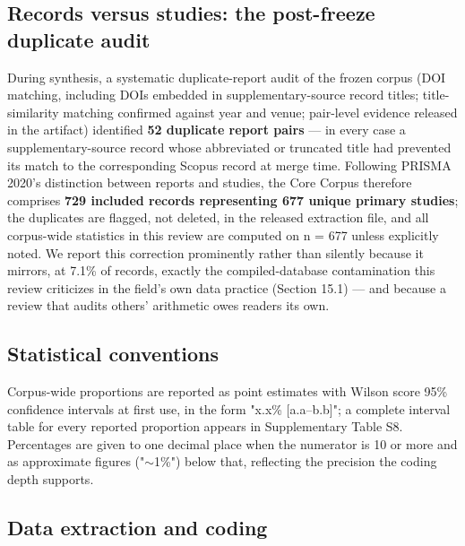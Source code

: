 \documentclass[pdflatex,sn-basic]{sn-jnl}
\begin{document}
\subsection{Records versus studies: the post-freeze duplicate audit}

During synthesis, a systematic duplicate-report audit of the frozen corpus (DOI matching, including DOIs embedded in supplementary-source record titles; title-similarity matching confirmed against year and venue; pair-level evidence released in the artifact) identified \textbf{52 duplicate report pairs} --- in every case a supplementary-source record whose abbreviated or truncated title had prevented its match to the corresponding Scopus record at merge time. Following PRISMA 2020's distinction between reports and studies, the Core Corpus therefore comprises \textbf{729 included records representing 677 unique primary studies}; the duplicates are flagged, not deleted, in the released extraction file, and all corpus-wide statistics in this review are computed on n = 677 unless explicitly noted. We report this correction prominently rather than silently because it mirrors, at 7.1\% of records, exactly the compiled-database contamination this review criticizes in the field's own data practice (Section 15.1) --- and because a review that audits others' arithmetic owes readers its own.

\subsection{Statistical conventions}

Corpus-wide proportions are reported as point estimates with Wilson score 95\% confidence intervals at first use, in the form "x.x\% [a.a--b.b]"; a complete interval table for every reported proportion appears in Supplementary Table S8. Percentages are given to one decimal place when the numerator is 10 or more and as approximate figures ("$\sim$1\%") below that, reflecting the precision the coding depth supports.

\subsection{Data extraction and coding}
\end{document}
